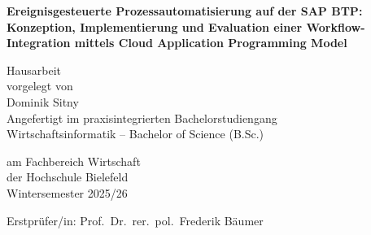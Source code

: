 \begin{titlepage}
    \centering
    \Large

    {\LARGE \textbf{Ereignisgesteuerte Prozessautomatisierung auf der SAP BTP: Konzeption, Implementierung und Evaluation einer Workflow-Integration mittels Cloud Application Programming Model}}

    \vfill
    Hausarbeit \\
    vorgelegt von \\
    Dominik Sitny \\

    \vspace*{2cm}
    Angefertigt im praxisintegrierten Bachelorstudiengang \\
    Wirtschaftsinformatik -- Bachelor of Science (B.Sc.)

    \vspace*{1cm}
    am Fachbereich Wirtschaft \\
    der Hochschule Bielefeld \\
    Wintersemester 2025/26

    \vspace*{5cm}
    {\normalsize
    Erstprüfer/in: \hspace{0.5cm} Prof.\ Dr.\ rer.\ pol.\ Frederik Bäumer \\
    }

\end{titlepage}
